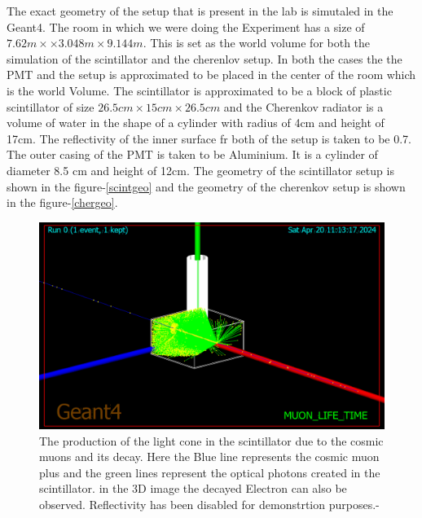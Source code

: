 \documentclass{article}
\begin{document}
\begin{multicols}{2}
The exact geometry of the setup that is present in the lab is simutaled in the Geant4. The room in which we were doing the Experiment has a size of $7.62m\times\times 3.048m \times 9.144m$. This is set as the world volume for both the simulation of the scintillator and the cherenlov setup. In both the cases the the PMT and the setup is approximated to be placed in the center of the room which is the world Volume. The scintillator is approximated to be a block of plastic scintillator of size $26.5cm \times 15cm \times 26.5cm$ and the Cherenkov radiator is a volume of water in the shape of a cylinder with radius of 4cm and height of 17cm. The reflectivity of the inner surface fr both of the setup is taken to be 0.7. The outer casing of the PMT is taken to be Aluminium. It is a cylinder of diameter 8.5 cm and height of 12cm. The geometry of the scintillator setup is shown in the figure-\ref{scintgeo} and the geometry of the cherenkov setup is shown in the figure-\ref{chergeo}.










\begin{figure}[H]
    \centering
    \includegraphics[width = \columnwidth]{Images/scint_sim_2.png}
    \caption{The production of the light cone in the scintillator due to the cosmic muons and its decay. Here the Blue line represents the cosmic muon plus and the green lines represent the optical photons created in the scintillator. in the 3D image the decayed Electron can also be observed. Reflectivity has been disabled for demonstrtion purposes.-\cite{agostinelli2003geant4}}
    \label{sim_run}
\end{figure}







\end{multicols}
\end{document}
